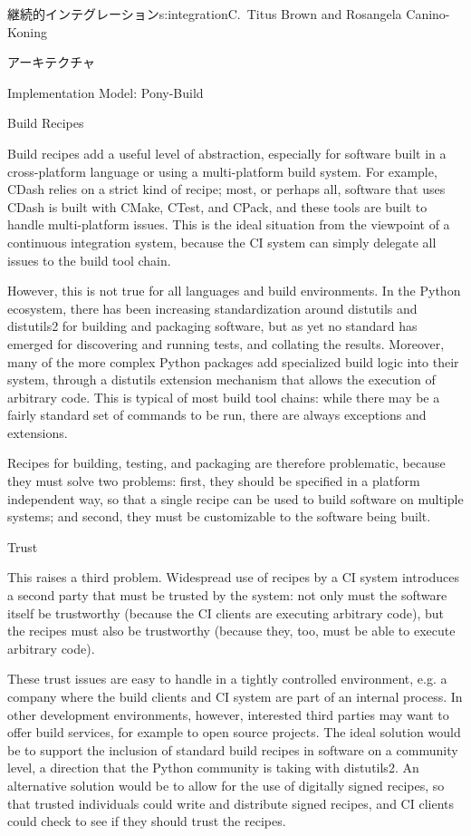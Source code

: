 \begin{aosachapter}{継続的インテグレーション}{s:integration}{C.\ Titus Brown and Rosangela Canino-Koning}
\begin{aosasect1}{アーキテクチャ}
\begin{aosasect2}{Implementation Model: Pony-Build}
\end{aosasect2}

\begin{aosasect2}{Build Recipes}

Build recipes add a useful level of abstraction, especially for
software built in a cross-platform language or using a multi-platform
build system. For example, CDash relies on a strict kind of
recipe; most, or perhaps all, software that uses CDash is built
with CMake, CTest, and CPack, and these tools are built to handle
multi-platform issues. This is the ideal situation from the viewpoint
of a continuous integration system, because the CI system can simply
delegate all issues to the build tool chain.

However, this is not true for all languages and build environments. In
the Python ecosystem, there has been increasing standardization around
distutils and distutils2 for building and packaging software, but as
yet no standard has emerged for discovering and running tests, and
collating the results. Moreover, many of the more complex Python
packages add specialized build logic into their system, through a
distutils extension mechanism that allows the execution of arbitrary
code. This is typical of most build tool chains: while there may be a
fairly standard set of commands to be run, there are always exceptions
and extensions.

Recipes for building, testing, and packaging are therefore
problematic, because they must solve two problems: first, they should
be specified in a platform independent way, so that a single recipe
can be used to build software on multiple systems; and second, they
must be customizable to the software being built.

\end{aosasect2}

\begin{aosasect2}{Trust}

This raises a third problem.  Widespread use of recipes by a CI system
introduces a second party that must be trusted by the system: not only
must the software itself be trustworthy (because the CI clients are
executing arbitrary code), but the recipes must also be trustworthy
(because they, too, must be able to execute arbitrary code).

These trust issues are easy to handle in a tightly controlled
environment, e.g. a company where the build clients and CI system are
part of an internal process. In other development environments,
however, interested third parties may want to offer build services,
for example to open source projects. The ideal solution would be to
support the inclusion of standard build recipes in software on a
community level, a direction that the Python community is taking with
distutils2. An alternative solution would be to allow for the use of
digitally signed recipes, so that trusted individuals could write and
distribute signed recipes, and CI clients could check to see if they
should trust the recipes.


\end{aosasect2}
\end{aosasect1}
\end{aosachapter}
